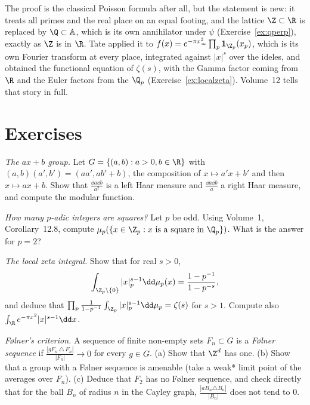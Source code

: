 \begin{beauty}
The proof is the classical Poisson formula after all, but the statement is new: it treats all primes and the real place on an equal footing, and the
lattice $\Z\subset\R$ is replaced by $\Q\subset\mathbb A$, which is its own annihilator under $\psi$ (Exercise~\ref{ex:qperp}), exactly as $\Z$ is in $\R$. Tate applied it to
$f(x)=e^{-\pi x_\infty^2}\prod_p\mathbf 1_{\Z_p}(x_p)$, which is its own Fourier transform at every place, integrated against $|x|^s$ over the ideles, and obtained the functional
equation of $\zeta(s)$, with the Gamma factor coming from $\R$ and the Euler factors from the $\Q_p$ (Exercise~\ref{ex:localzeta}). Volume~12 tells that story in full.
\end{beauty}

\section{Exercises}

\begin{exercise}[$\star$]\label{ex:axb}
\emph{The $ax+b$ group.} Let $G=\{(a,b):a>0,b\in\R\}$ with $(a,b)(a',b')=(aa',ab'+b)$, the composition of $x\mapsto a'x+b'$ and then $x\mapsto ax+b$. Show that $\frac{\dd a\dd b}{a^2}$ is a left
Haar measure and $\frac{\dd a\dd b}a$ a right Haar measure, and compute the modular function.
\end{exercise}

\begin{exercise}[$\star\star$]\label{ex:squareszp}
\emph{How many $p$-adic integers are squares?} Let $p$ be odd. Using Volume~1, Corollary~12.8, compute $\mu_p(\{x\in\Z_p:x\text{ is a square in }\Q_p\})$. What is the answer for $p=2$?
\end{exercise}

\begin{exercise}[$\star\star$]\label{ex:localzeta}
\emph{The local zeta integral.} Show that for real $s>0$,
\[\int_{\Z_p\setminus\{0\}}|x|_p^{s-1}\dd\mu_p(x)=\frac{1-p^{-1}}{1-p^{-s}},\]
and deduce that $\prod_p\frac1{1-p^{-1}}\int_{\Z_p}|x|_p^{s-1}\dd\mu_p=\zeta(s)$ for $s>1$. Compute also $\int_\R e^{-\pi x^2}|x|^{s-1}\dd x$.
\end{exercise}

\begin{exercise}[$\star\star$]\label{ex:folner}
\emph{F{\o}lner's criterion.} A sequence of finite non-empty sets $F_n\subset G$ is a \emph{F{\o}lner sequence} if $\frac{|gF_n\,\triangle\,F_n|}{|F_n|}\to0$ for every $g\in G$. (a) Show that
$\Z^d$ has one. (b) Show that a group with a F{\o}lner sequence is amenable (take a weak* limit point of the averages over $F_n$). (c) Deduce that $F_2$ has no F{\o}lner
sequence, and check directly that for the ball $B_n$ of radius $n$ in the Cayley graph, $\frac{|aB_n\triangle B_n|}{|B_n|}$ does not tend to $0$.
\end{exercise}

